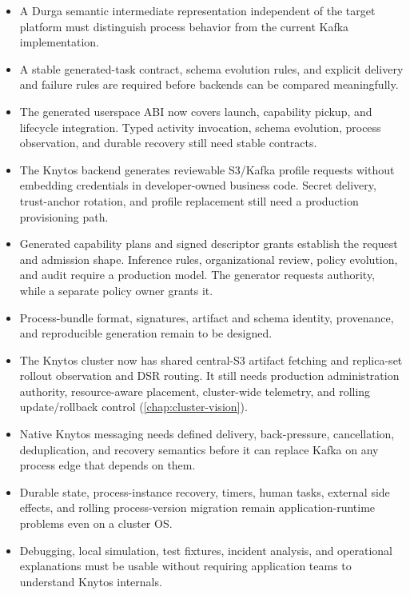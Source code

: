 \begin{itemize}
    \item A Durga semantic intermediate representation independent of the target
        platform must distinguish process behavior from the current Kafka
        implementation.

    \item A stable generated-task contract, schema evolution rules, and explicit
        delivery and failure rules are required before backends can be
        compared meaningfully.

    \item The generated userspace ABI now covers launch, capability pickup, and
        lifecycle integration. Typed activity invocation, schema evolution,
        process observation, and durable recovery still need stable contracts.

    \item The Knytos backend generates reviewable S3/Kafka profile requests
        without embedding credentials in developer-owned business code. Secret
        delivery, trust-anchor rotation, and profile replacement still need a
        production provisioning path.

    \item Generated capability plans and signed descriptor grants establish the
        request and admission shape. Inference rules, organizational review,
        policy evolution, and audit require a production model. The generator
        requests authority, while a separate policy owner grants it.

    \item Process-bundle format, signatures, artifact and schema identity,
        provenance, and reproducible generation remain to be designed.

    \item The Knytos cluster now has shared central-S3 artifact fetching and
        replica-set rollout observation and DSR routing. It still needs
        production administration authority, resource-aware placement,
        cluster-wide telemetry, and rolling update/rollback control
        (\autoref{chap:cluster-vision}).

    \item Native Knytos messaging needs defined delivery, back-pressure,
        cancellation, deduplication, and recovery semantics before it can
        replace Kafka on any process edge that depends on them.

    \item Durable state, process-instance recovery, timers, human tasks,
        external side effects, and rolling process-version migration remain
        application-runtime problems even on a cluster OS.

    \item Debugging, local simulation, test fixtures, incident analysis, and
        operational explanations must be usable without requiring application
        teams to understand Knytos internals.
\end{itemize}

